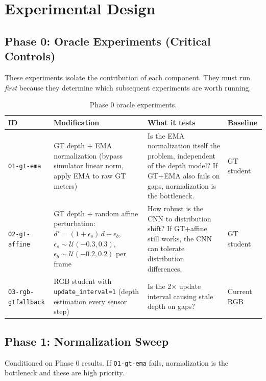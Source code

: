 \documentclass[11pt,a4paper]{article}
\begin{document}
\section{Experimental Design}

\subsection{Phase 0: Oracle Experiments (Critical Controls)}

These experiments isolate the contribution of each component.  They must
run \emph{first} because they determine which subsequent experiments are
worth running.

\begin{table}[h]
\centering
\small
\begin{tabular}{p{2.5cm}p{4cm}p{5.5cm}p{2.5cm}}
\toprule
\textbf{ID} & \textbf{Modification} & \textbf{What it tests} & \textbf{Baseline} \\
\midrule
\texttt{O1-gt-ema} &
  GT depth $+$ EMA normalization (bypass simulator linear norm, apply EMA to raw GT meters) &
  Is the EMA normalization itself the problem, independent of the depth model? If GT+EMA also fails on gaps, normalization is the bottleneck. &
  GT student \\
\midrule
\texttt{O2-gt-affine} &
  GT depth $+$ random affine perturbation: $d' = (1 + \epsilon_s)\,d + \epsilon_b$, $\epsilon_s \sim \mathcal{U}(-0.3, 0.3)$, $\epsilon_b \sim \mathcal{U}(-0.2, 0.2)$ per frame &
  How robust is the CNN to distribution shift? If GT+affine still works, the CNN can tolerate distribution differences. &
  GT student \\
\midrule
\texttt{O3-rgb-gtfallback} &
  RGB student with \texttt{update\_interval=1} (depth estimation every sensor step) &
  Is the 2$\times$ update interval causing stale depth on gaps? &
  Current RGB \\
\bottomrule
\end{tabular}
\caption{Phase 0 oracle experiments.}
\label{tab:phase0}
\end{table}

\subsection{Phase 1: Normalization Sweep}

Conditioned on Phase 0 results.  If \texttt{O1-gt-ema} fails, normalization
is the bottleneck and these are high priority.
\end{document}
